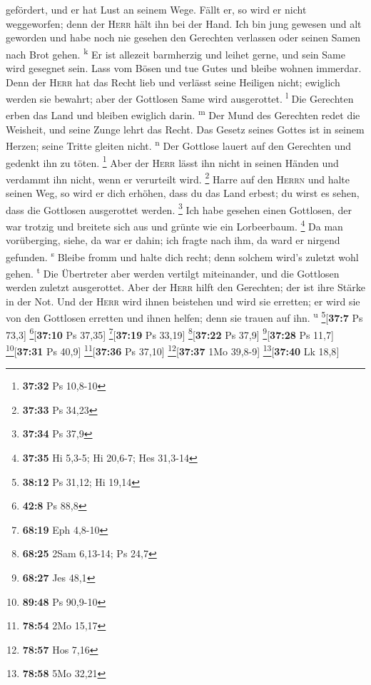 gefördert, und er hat Lust an seinem Wege.  Fällt er, so
wird er nicht weggeworfen; denn der \textsc{Herr} hält ihn bei der Hand.
 Ich bin jung gewesen und alt geworden und habe noch nie
gesehen den Gerechten verlassen oder seinen Samen nach Brot gehen.
\textsuperscript{k}  Er ist allezeit barmherzig und
leihet gerne, und sein Same wird gesegnet sein.  Lass vom
Bösen und tue Gutes und bleibe wohnen immerdar.  Denn der
\textsc{Herr} hat das Recht lieb und verlässt seine Heiligen nicht;
ewiglich werden sie bewahrt; aber der Gottlosen Same wird ausgerottet.
\textsuperscript{l}  Die Gerechten erben das Land und
bleiben ewiglich darin. \textsuperscript{m}  Der Mund des
Gerechten redet die Weisheit, und seine Zunge lehrt das Recht.
 Das Gesetz seines Gottes ist in seinem Herzen; seine
Tritte gleiten nicht. \textsuperscript{n}  Der Gottlose
lauert auf den Gerechten und gedenkt ihn zu töten. \footnote{\textbf{37:32}
  Ps 10,8-10}  Aber der \textsc{Herr} lässt ihn nicht in
seinen Händen und verdammt ihn nicht, wenn er verurteilt wird.
\footnote{\textbf{37:33} Ps 34,23}  Harre auf den
\textsc{Herrn} und halte seinen Weg, so wird er dich erhöhen, dass du
das Land erbest; du wirst es sehen, dass die Gottlosen ausgerottet
werden. \footnote{\textbf{37:34} Ps 37,9}  Ich habe
gesehen einen Gottlosen, der war trotzig und breitete sich aus und
grünte wie ein Lorbeerbaum. \footnote{\textbf{37:35} Hi 5,3-5; Hi
  20,6-7; Hes 31,3-14}  Da man vorüberging, siehe, da war
er dahin; ich fragte nach ihm, da ward er nirgend gefunden.
\textsuperscript{s}  Bleibe fromm und halte dich recht;
denn solchem wird's zuletzt wohl gehen. \textsuperscript{t}
 Die Übertreter aber werden vertilgt miteinander, und die
Gottlosen werden zuletzt ausgerottet.  Aber der
\textsc{Herr} hilft den Gerechten; der ist ihre Stärke in der Not.
 Und der \textsc{Herr} wird ihnen beistehen und wird sie
erretten; er wird sie von den Gottlosen erretten und ihnen helfen; denn
sie trauen auf ihn. \textsuperscript{u} \footnote{\textbf{38:12} Ps
  31,12; Hi 19,14}{[}\textbf{37:7} Ps 73,3{]}
\footnote{\textbf{42:8} Ps 88,8}{[}\textbf{37:10} Ps 37,35{]}
\footnote{\textbf{68:19} Eph 4,8-10}{[}\textbf{37:19} Ps 33,19{]}
\footnote{\textbf{68:25} 2Sam 6,13-14; Ps 24,7}{[}\textbf{37:22} Ps
37,9{]} \footnote{\textbf{68:27} Jes 48,1}{[}\textbf{37:28} Ps 11,7{]}
\footnote{\textbf{89:48} Ps 90,9-10}{[}\textbf{37:31} Ps 40,9{]}
\footnote{\textbf{78:54} 2Mo 15,17}{[}\textbf{37:36} Ps 37,10{]}
\footnote{\textbf{78:57} Hos 7,16}{[}\textbf{37:37} 1Mo 39,8-9{]}
\footnote{\textbf{78:58} 5Mo 32,21}{[}\textbf{37:40} Lk 18,8{]}

